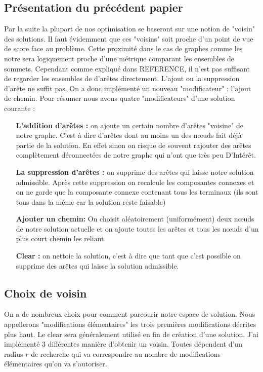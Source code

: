 \documentclass[10pt,a4paper]{article}
\begin{document}
\subsection{Présentation du précédent papier}
Par la suite la plupart de nos optimisation se baseront sur une notion de "voisin" des solutions. Il faut évidemment que ces "voisins" soit proche d'un point de vue de score face au problème. Cette proximité dans le cas de graphes comme les notre sera logiquement proche d'une métrique comparant les ensembles de sommets. Cependant comme expliqué dans REFERENCE, il n'est pas suffisant de regarder les ensembles de d’arêtes directement. L'ajout ou la suppression d’arête ne suffit pas. On a donc implémenté un nouveau "modificateur" : l'ajout de chemin. 
Pour résumer nous avons quatre "modificateurs" d'une solution courante :
\begin{itemize}   
\item[\textbf{L'addition  d’arêtes : }] on ajoute un certain nombre d'arêtes "voisine" de notre graphe. C'est à dire d'arêtes dont au moins un des nœuds fait déjà partie de la solution. En effet sinon on risque de souvent rajouter des arêtes complètement déconnectées de notre graphe qui n'ont que très peu D’Intérêt.
\item[\textbf{La suppression d’arêtes : }] on supprime des arêtes qui laisse notre solution admissible. Après cette suppression on recalcule les composantes connexes et on ne garde que la composante connexe contenant tous les terminaux (ils sont tous dans la même car la solution reste faisable) 
\item[\textbf{Ajouter un chemin: }] On choisit aléatoirement (uniformément) deux nœuds de notre solution actuelle et on ajoute toutes les arêtes et tous les nœuds d'un plus court chemin les reliant.
\item[\textbf{Clear : }] on nettoie la solution, c'est à dire que tant que c'est possible on supprime des arêtes qui laisse la solution admissible.
\end{itemize}

\subsection{Choix de voisin}

On a de nombreux choix pour comment parcourir notre espace de solution. Nous appellerons "modifications élémentaires" les trois premières modifications décrites plus haut. Le clear sera généralement utilisé en fin de création d'une solution. J'ai implémenté 3 différentes manière d'obtenir un voisin. Toutes dépendent d'un radius $ r$ de recherche qui va correspondre au nombre de modifications élémentaires qu'on va s'autoriser. 
\end{document}
